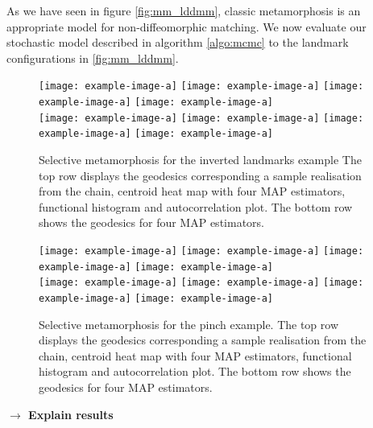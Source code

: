 \documentclass[runningheads]{llncs}
\begin{document}
As we have seen in figure \ref{fig:mm_lddmm}, classic metamorphosis is an
appropriate model for non-diffeomorphic matching. We now evaluate our stochastic
model described in algorithm \ref{algo:mcmc} to the landmark configurations in
\ref{fig:mm_lddmm}.

\begin{figure}
\centering
\begin{minipage}{\textwidth}
  \centering
    \texttt{[image: example-image-a]}\quad
    \texttt{[image: example-image-a]}\quad
    \texttt{[image: example-image-a]}\quad
    \texttt{[image: example-image-a]}\\[0.25cm]
    \texttt{[image: example-image-a]}\quad
    \texttt{[image: example-image-a]}\quad
    \texttt{[image: example-image-a]}\quad
    \texttt{[image: example-image-a]}
    \caption{Selective metamorphosis for the inverted landmarks example The top
    row displays the geodesics corresponding a sample realisation from the
    chain, centroid heat map with four MAP estimators, functional histogram and
    autocorrelation plot. The bottom row shows the geodesics for four MAP
    estimators.}
    \label{fig:selective:crisscross}
\end{minipage}
\end{figure}
\begin{figure}
\centering
\begin{minipage}{\textwidth}
  \centering
    \texttt{[image: example-image-a]}\quad
    \texttt{[image: example-image-a]}\quad
    \texttt{[image: example-image-a]}\quad
    \texttt{[image: example-image-a]}\\[0.25cm]
    \texttt{[image: example-image-a]}\quad
    \texttt{[image: example-image-a]}\quad
    \texttt{[image: example-image-a]}\quad
    \texttt{[image: example-image-a]}
    \caption{Selective metamorphosis for the pinch example. The top row displays
    the geodesics corresponding a sample realisation from the chain, centroid
    heat map with four MAP estimators, functional histogram and autocorrelation
    plot. The bottom row shows the geodesics for four MAP estimators.}
    \label{fig:selective:pinch}
\end{minipage}
\end{figure}

\textbf{$\longrightarrow$ Explain results}\\
\end{document}
